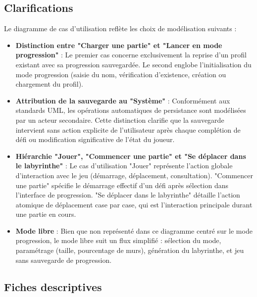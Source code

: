 \documentclass{butexFR}
\begin{document}
\subsection{Clarifications}

Le diagramme de cas d'utilisation reflète les choix de modélisation suivants :

\begin{itemize}
    \item \textbf{Distinction entre "Charger une partie" et "Lancer en mode progression"} : Le premier cas concerne exclusivement la reprise d'un profil existant avec sa progression sauvegardée. Le second englobe l'initialisation du mode progression (saisie du nom, vérification d'existence, création ou chargement du profil).

    \item \textbf{Attribution de la sauvegarde au "Système"} : Conformément aux standards UML, les opérations automatiques de persistance sont modélisées par un acteur secondaire. Cette distinction clarifie que la sauvegarde intervient sans action explicite de l'utilisateur après chaque complétion de défi ou modification significative de l'état du joueur.

    \item \textbf{Hiérarchie "Jouer", "Commencer une partie" et "Se déplacer dans le labyrinthe"} : Le cas d'utilisation "Jouer" représente l'action globale d'interaction avec le jeu (démarrage, déplacement, consultation). "Commencer une partie" spécifie le démarrage effectif d'un défi après sélection dans l'interface de progression. "Se déplacer dans le labyrinthe" détaille l'action atomique de déplacement case par case, qui est l'interaction principale durant une partie en cours.

    \item \textbf{Mode libre} : Bien que non représenté dans ce diagramme centré sur le mode progression, le mode libre suit un flux simplifié : sélection du mode, paramétrage (taille, pourcentage de murs), génération du labyrinthe, et jeu sans sauvegarde de progression.
\end{itemize}

\newpage

\subsection{Fiches descriptives}
\end{document}
